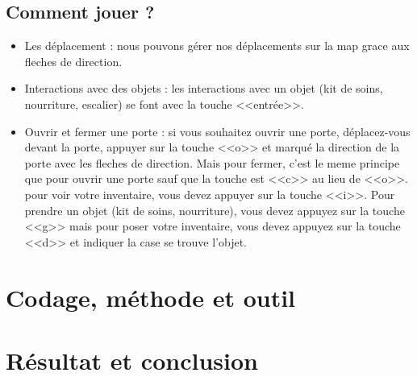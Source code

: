 \documentclass[12pt]{report}
\begin{document}
	\section{Comment jouer ?}
		\begin{itemize}
			\item{Les déplacement :}
				nous pouvons gérer nos déplacements sur la map grace aux fleches de direction. 
			\item{Interactions avec des objets :}	
				les interactions avec un objet (kit de soins, nourriture, escalier) se font avec la touche <<entrée>>.
			\item{Ouvrir et fermer une porte :}	
				si vous souhaitez ouvrir une porte, déplacez-vous devant la porte, appuyer sur la touche <<o>> et marqué la direction de la porte avec les fleches de direction.
				Mais pour fermer, c'est le meme principe que pour ouvrir une porte sauf que la touche est <<c>> au lieu de <<o>>.
				pour voir votre inventaire, vous devez appuyer sur la touche <<i>>. Pour prendre un objet (kit de soins, nourriture), vous devez appuyez sur la touche <<g>> mais pour poser votre inventaire, vous devez appuyez sur la touche <<d>> et indiquer la case  se trouve l'objet.
		\end{itemize}
		
		
\chapter{Codage, méthode et outil}

\chapter{Résultat et conclusion}
\end{document}
